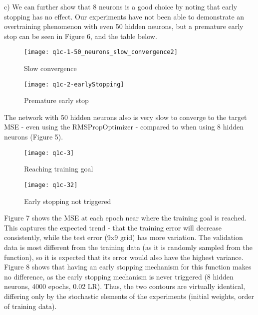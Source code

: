 \documentclass[11pt]{article}
\begin{document}
\begin{enumerate}
c) We can further show that 8 neurons is a good choice by noting that early stopping has no effect. Our experiments have not been able to demonstrate an overtraining phenomenon with even 50 hidden neurons, but a premature early stop can be seen in Figure 6, and the table below.\newline


\begin{figure}[h!]
    \centering
    \begin{minipage}{0.45\textwidth}
        \centering
        \texttt{[image: q1c-1-50\_neurons\_slow\_convergence2]} %
        \caption{Slow convergence}
    \end{minipage}\hfill
    \begin{minipage}{0.45\textwidth}
        \centering
        \texttt{[image: q1c-2-earlyStopping]} %
        \caption{Premature early stop}
    \end{minipage}
\end{figure}

The network with 50 hidden neurons also is very slow to converge to the target MSE - even using the RMSPropOptimizer - compared to when using 8 hidden neurons (Figure 5).\newline

\begin{figure}[h!]
    \centering
    \begin{minipage}{0.45\textwidth}
        \centering
        \texttt{[image: q1c-3]} %
        \caption{Reaching training goal}
    \end{minipage}\hfill
    \begin{minipage}{0.45\textwidth}
        \centering
        \texttt{[image: q1c-32]} %
        \caption{Early stopping not triggered}
    \end{minipage}
\end{figure}

Figure 7 shows the MSE at each epoch near where the training goal is reached. This captures the expected trend - that the training error will decrease consistently, while the test error (9x9 grid) has more variation. The validation data is most different from the training data (as it is randomly sampled from the function), so it is expected that its error would also have the highest variance.\newline
\newline
Figure 8 shows that having an early stopping mechanism for this function makes no difference, as the early stopping mechanism is never triggered (8 hidden neurons, 4000 epochs, 0.02 LR). Thus, the two contours are virtually identical, differing only by the stochastic elements of the experiments (initial weights, order of training data). 


\end{enumerate}
\end{document}
